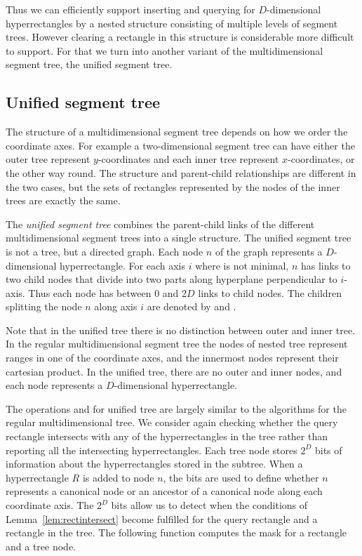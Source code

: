 \documentclass[english,gradu]{tktltiki2018}
\begin{document}
Thus we can efficiently support inserting and querying for $D$-dimensional hyperrectangles by a nested structure consisting of multiple levels of segment trees.
However clearing a rectangle in this structure is considerable more difficult to support.
For that we turn into another variant of the multidimensional segment tree, the unified segment tree.

\subsection{Unified segment tree}\label{sec:unifiedtree}

The structure of a multidimensional segment tree depends on how we order the coordinate axes.
For example a two-dimensional segment tree can have either the outer tree represent $y$-coordinates and each inner tree represent $x$-coordinates, or the other way round.
The structure and parent-child relationships are different in the two cases, but the sets of rectangles represented by the nodes of the inner trees are exactly the same.

The \emph{unified segment tree} combines the parent-child links of the different multidimensional segment trees into a single structure.
The unified segment tree is not a tree, but a directed graph.
Each node $n$ of the graph represents a $D$-dimensional hyperrectangle.
For each axis $i$ where  is not minimal, $n$ has links to two child nodes that divide  into two parts along hyperplane perpendicular to $i$-axis.
Thus each node has between 0 and $2D$ links to child nodes.
The children splitting the node $n$ along axis $i$ are denoted by  and .

Note that in the unified tree there is no distinction between outer and inner tree.
In the regular multidimensional segment tree the nodes of nested tree represent ranges in one of the coordinate axes, and the innermost nodes represent their cartesian product.
In the unified tree, there are no outer and inner nodes, and each node represents a $D$-dimensional hyperrectangle.

The operations \adddt and \checkdt for unified tree are largely similar to the algorithms for the regular multidimensional tree.
We consider again checking whether the query rectangle intersects with any of the hyperrectangles in the tree rather than reporting all the intersecting hyperrectangles.
Each tree node stores $2^D$ bits of information about the hyperrectangles stored in the subtree.
When a hyperrectangle $R$ is added to node $n$, the bits are used to define whether $n$ represents a canonical node or an ancestor of a canonical node along each coordinate axis.
The $2^D$ bits allow us to detect when the conditions of Lemma~\ref{lem:rectintersect} become fulfilled for the query rectangle and a rectangle in the tree.
The following function computes the mask for a rectangle and a tree node.
\end{document}
